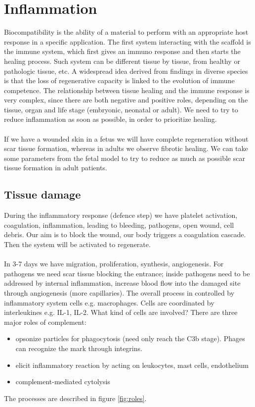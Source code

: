 \graphicspath{{chapters/inflammation/}}
\chapter{Inflammation}

Biocompatibility is the ability of a material to perform with an appropriate host response in a specific application.
The first system interacting with the scaffold is the immune system, which first gives an immuno response and then starts the healing process. 
Such system can be different tissue by tissue, from healthy or pathologic tissue, etc.
A widespread idea derived from findings in diverse species is that the loss of regenerative capacity is linked to the evolution of immune competence. 
The relationship between tissue healing and the immune response is very complex, since there are both negative and positive roles, depending on the tissue, organ and life stage (embryonic, neonatal or adult). We need to try to reduce inflammation as soon as possible, in order to prioritize healing.
\\
\\
\noindent
If we have a wounded skin in a fetus we will have complete regeneration without scar tissue formation, whereas in adults we observe fibrotic healing. We can take some parameters from the fetal model to try to reduce as much as possible scar tissue formation in adult patients.

\section{Tissue damage}
During the inflammatory response (defence step) we have platelet activation, coagulation, inflammation, leading to bleeding, pathogens, open wound, cell debris. 
Our aim is to block the wound, our body triggers a coagulation cascade. 
Then the system will be activated to regenerate. 
\\
\\
\noindent
In 3-7 days we have migration, proliferation, synthesis, angiogenesis. 
For pathogens we need scar tissue blocking the entrance; inside pathogens need to be addressed by internal inflammation, increase blood flow into the damaged site through angiogenesis (more capillaries).
The overall process in controlled by inflammatory system cells e.g. macrophages. 
Cells are coordinated by interleukines e.g. IL-1, IL-2.
\noindent
What kind of cells are involved? There are three major roles of complement:
\begin{itemize}
\item opsonize particles for phagocytosis (need only reach the C3b stage). Phages can recognize the mark through integrins.
\item elicit inflammatory reaction by acting on leukocytes, mast cells, endothelium
\item complement-mediated cytolysis
\end{itemize}
\noindent
The processes are described in figure \ref{fig:roles}.

